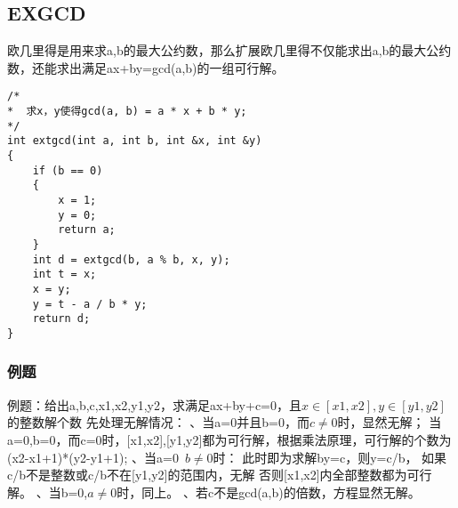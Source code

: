\subsection{EXGCD}
欧几里得是用来求a,b的最大公约数，那么扩展欧几里得不仅能求出a,b的最大公约数，还能求出满足ax+by=gcd(a,b)的一组可行解。
\begin{lstlisting}
/*
*  求x，y使得gcd(a, b) = a * x + b * y;
*/
int extgcd(int a, int b, int &x, int &y)
{
	if (b == 0)
	{
		x = 1;
		y = 0;
		return a;
	}
	int d = extgcd(b, a % b, x, y);
	int t = x;
	x = y;
	y = t - a / b * y;
	return d;
}
\end{lstlisting}
\subsubsection{例题}
例题：给出a,b,c,x1,x2,y1,y2，求满足ax+by+c=0，且$ x\in[x1,x2],y\in[y1,y2] $的整数解个数
\newline
\newline
先处理无解情况：
、当a=0并且b=0，而$ c\neq 0 $时，显然无解；
当a=0,b=0，而c=0时，[x1,x2],[y1,y2]都为可行解，根据乘法原理，可行解的个数为(x2-x1+1)*(y2-y1+1);
\newline
{}、当a=0 $ b\neq 0 $时：
此时即为求解by=c，则y=c/b，
如果c/b不是整数或c/b不在[y1,y2]的范围内，无解
否则[x1,x2]内全部整数都为可行解。
\newline
{}、当b=0,$ a\neq 0 $时，同上。
\newline
{}、若c不是gcd(a,b)的倍数，方程显然无解。
